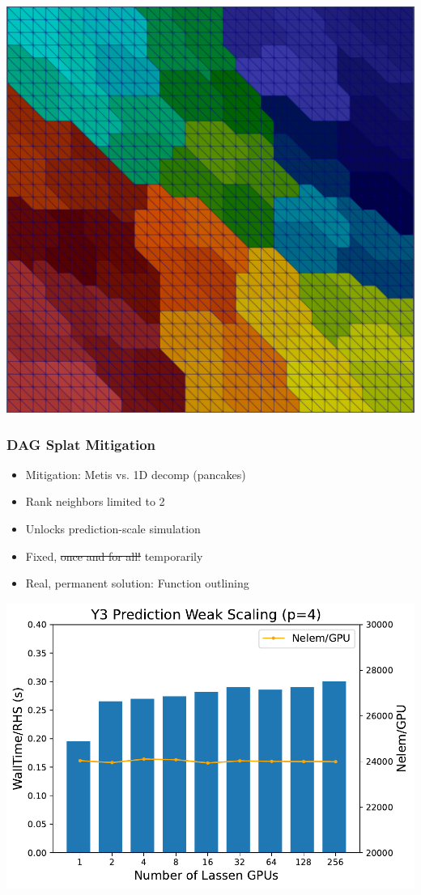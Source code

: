 \begin{frame}
\begin{minipage}[t][0.4\textheight][t]{\textwidth}
\vspace{-20pt}
\includegraphics[width=.3\textwidth]{Figures/np64_part.png}
\end{minipage}
\end{frame}

\begin{frame}\frametitle{DAG Splat Mitigation}
\begin{minipage}[t][0.4\textheight][t]{\textwidth}
\begin{multicols}{2}
\rule{0pt}{20pt}
\begin{itemize}
\setlength{\itemsep}{0pt} %
\setlength{\parskip}{0pt} %
\setlength{\topsep}{0pt} %
\item Mitigation: Metis vs. 1D decomp (pancakes)
\item Rank neighbors limited to 2
\item Unlocks prediction-scale simulation
\item Fixed, \sout{once and for all!} temporarily
\item Real, permanent solution: Function outlining
\end{itemize}
\columnbreak
\includegraphics[width=.43\textwidth]{Figures/mtc/y3-prediction_weak_scaling.pdf}
\end{multicols}
\end{minipage}\vfill

\end{frame}
